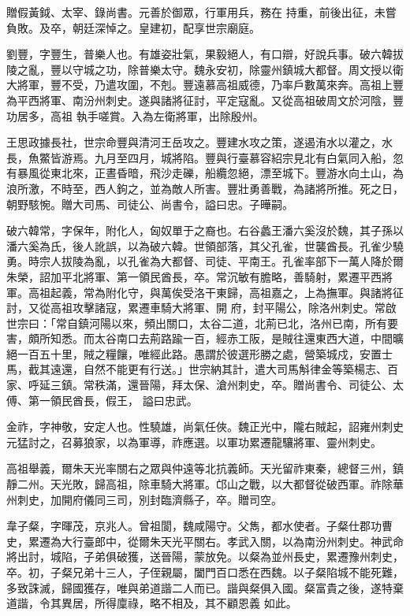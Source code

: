 \begin{pinyinscope}
 贈假黃鉞、太宰、錄尚書。元善於御眾，行軍用兵，務在
 持重，前後出征，未嘗負敗。及卒，朝廷深悼之。皇建初，配享世宗廟庭。



 劉豐，字豐生，普樂人也。有雄姿壯氣，果毅絕人，有口辯，好說兵事。破六韓拔陵之亂，豐以守城之功，除普樂太守。魏永安初，除靈州鎮城大都督。周文授以衛大將軍，豐不受，乃遣攻圍，不剋。豐遠慕高祖威德，乃率戶數萬來奔。高祖上豐為平西將軍、南汾州刺史。遂與諸將征討，平定寇亂。又從高祖破周文於河陰，豐功居多，高祖
 執手嗟賞。入為左衛將軍，出除殷州。



 王思政據長社，世宗命豐與清河王岳攻之。豐建水攻之策，遂遏洧水以灌之，水長，魚鱉皆游焉。九月至四月，城將陷。豐與行臺慕容紹宗見北有白氣同入船，忽有暴風從東北來，正晝昏暗，飛沙走礫，船纜忽絕，漂至城下。豐游水向土山，為浪所激，不時至，西人鉤之，並為敵人所害。豐壯勇善戰，為諸將所推。死之日，朝野駭惋。贈大司馬、司徒公、尚書令，謚曰忠。子曄嗣。



 破六韓常，字保年，附化人，匈奴單于之裔也。右谷蠡王潘六奚沒於魏，其子孫以潘六奚為氏，後人訛誤，以為破六韓。世領部落，其父孔雀，世襲酋長。孔雀少驍勇。時宗人拔陵為亂，以孔雀為大都督、司徒、平南王。孔雀率部下一萬人降於爾朱榮，詔加平北將軍、第一領民酋長，卒。常沉敏有膽略，善騎射，累遷平西將軍。高祖起義，常為附化守，與萬俟受洛干東歸，高祖嘉之，上為撫軍。與諸將征討，又從高祖攻擊諸寇，累遷車騎大將軍、開
 府，封平陽公，除洛州刺史。常啟世宗曰：「常自鎮河陽以來，頻出關口，太谷二道，北荊已北，洛州已南，所有要害，頗所知悉。而太谷南口去荊路踰一百，經赤工阪，是賊往還東西大道，中間曠絕一百五十里，賊之糧饟，唯經此路。愚謂於彼選形勝之處，營築城戍，安置士馬，截其遠還，自然不能更有行送。」世宗納其計，遣大司馬斛律金等築楊志、百家、呼延三鎮。常秩滿，還晉陽，拜太保、滄州刺史，卒。贈尚書令、司徒公、太傅、第一領民酋長，假王，
 謚曰忠武。



 金祚，字神敬，安定人也。性驍雄，尚氣任俠。魏正光中，隴右賊起，詔雍州刺史元猛討之，召募狼家，以為軍導，祚應選。以軍功累遷龍驤將軍、靈州刺史。



 高祖舉義，爾朱天光率關右之眾與仲遠等北抗義師。天光留祚東秦，總督三州，鎮靜二州。天光敗，歸高祖，除車騎大將軍。邙山之戰，以大都督從破西軍。祚除華州刺史，加開府儀同三司，別封臨濟縣子，卒。贈司空。



 韋子粲，字暉茂，京兆人。曾祖閬，魏咸陽守。父雋，都水使者。子粲仕郡功曹史，累遷為大行臺郎中，從爾朱天光平關右。孝武入關，以為南汾州刺史。神武命將出討，城陷，子弟俱破獲，送晉陽，蒙放免。以粲為並州長史，累遷豫州刺史，卒。初，子粲兄弟十三人，子侄親屬，闔門百口悉在西魏。以子粲陷城不能死難，多致誅滅，歸國獲存，唯與弟道諧二人而已。諧與粲俱入國。粲富貴之後，遂特棄道諧，令其異居，所得廩祿，略不相及，其不顧恩義
 如此。



\end{pinyinscope}